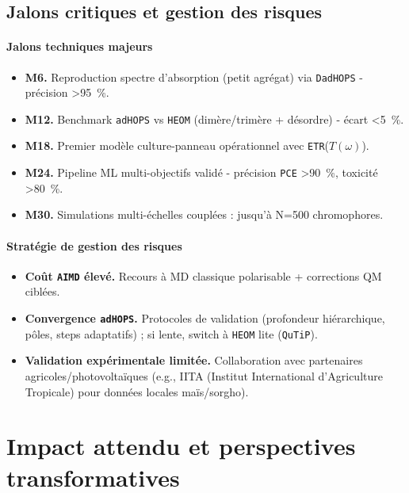 \documentclass[12pt, a4paper]{article}
\begin{document}
\subsection{Jalons critiques et gestion des risques}

\paragraph{Jalons techniques majeurs}
\begin{itemize}
    \item \textbf{M6.} Reproduction spectre d'absorption (petit agrégat) via \texttt{DadHOPS} - précision \SI{>95}{\percent}.
    \item \textbf{M12.} Benchmark \texttt{adHOPS} vs \texttt{HEOM} (dimère/trimère + désordre) - écart \SI{<5}{\percent}.
    \item \textbf{M18.} Premier modèle culture-panneau opérationnel avec \texttt{ETR}($T(\omega)$).
    \item \textbf{M24.} Pipeline ML multi-objectifs validé - précision \texttt{PCE} \SI{>90}{\percent}, toxicité \SI{>80}{\percent}.
    \item \textbf{M30.} Simulations multi-échelles couplées : jusqu'à N=\num{500} chromophores.
\end{itemize}

\paragraph{Stratégie de gestion des risques}
\begin{itemize}
    \item \textbf{Coût \texttt{AIMD} élevé.} Recours à MD classique polarisable + corrections QM ciblées.
    \item \textbf{Convergence \texttt{adHOPS}.} Protocoles de validation (profondeur hiérarchique, pôles, steps adaptatifs) ; si lente, switch à \texttt{HEOM} lite (\texttt{QuTiP}).
    \item \textbf{Validation expérimentale limitée.} Collaboration avec partenaires agricoles/photovoltaïques (e.g., IITA (Institut International d'Agriculture Tropicale) pour données locales maïs/sorgho).
\end{itemize}


\section{Impact attendu et perspectives transformatives}
\end{document}
